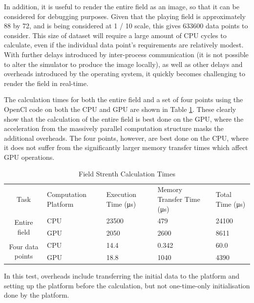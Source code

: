 \documentclass[10pt]{article}
\begin{document}
In addition, it is useful to render the entire field as an image, so that it can
be considered for debugging purposes. Given that the playing field is
approximately \SI{88}{\inch} by \SI{72}{\inch}, and is being considered at
\SI[quotient-mode = fraction]{1 / 10}{\inch} scale, this gives \num{633600} data
points to consider. This size of dataset will require a large amount of CPU
cycles to calculate, even if the individual data point's requirements are
relatively modest. With further delays introduced by inter-process communication
(it is not possible to alter the simulator to produce the image locally), as
well as other delays and overheads introduced by the operating system, it
quickly becomes challenging to render the field in real-time.

The calculation times for both the entire field and a set of four points using
the OpenCl code on both the CPU and GPU are shown in Table
\ref{tab:Field-Strenth-Calculation}. These clearly show that the calculation of
the entire field is best done on the GPU, where the acceleration from the
massively parallel computation structure masks the additional overheads. The
four points, however, are best done on the CPU, where it does not suffer from
the significantly larger memory transfer times which affect GPU operations.

\begin{singlespace}
\begin{table}
\centering%
\begin{tabular}{|c|m{2cm}|p{2cm}|p{3cm}|m{2cm}|}
\hline
\multirow{2}{*}{Task} & \multirow{2}{3cm}{Computation Platform} &
\multirow{2}{2cm}{Execution Time (\si{\micro\second})} &
\multirow{2}{3cm}{Memory Transfer Time (\si{\micro\second})} &
\multirow{2}{1.8cm}{Total Time (\si{\micro\second})} \\
 &  &  &  & \\
\hline
\multirow{2}{*}{Entire field} & CPU & \num{23500} & \num{479} & \num{24100}
\\
\cline{2-5}
 & GPU & \num{2050} & \num{2600} & \num{8611} \\
\hline
\multirow{2}{*}{Four data points} & CPU & \num{14.4} & \num{0.342} &
\num{60.0}
\\
\cline{2-5}
 & GPU & \num{18.8} & \num{1040} & \num{4390} \\
\hline
\end{tabular}

In this test, overheads include transferring the initial data to the platform
and setting up the platform before the calculation, but not one-time-only
initialisation done by the platform.

\caption{Field Strenth Calculation Times\label{tab:Field-Strenth-Calculation}}
\end{table}

\end{singlespace}
\end{document}
